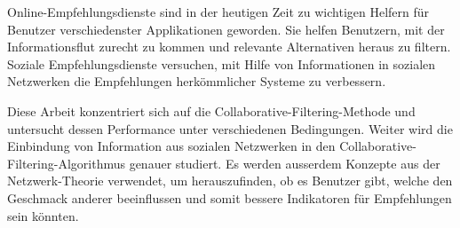 \begin{zusammenfassung}
Online-Empfehlungsdienste sind in der heutigen Zeit zu wichtigen Helfern f\"ur Benutzer verschiedenster Applikationen geworden. Sie helfen Benutzern, mit der Informationsflut zurecht zu kommen und relevante Alternativen heraus zu filtern. Soziale Empfehlungsdienste versuchen, mit Hilfe von Informationen in sozialen Netzwerken die Empfehlungen herk\"ommlicher Systeme zu verbessern.

Diese Arbeit konzentriert sich auf die Collaborative-Filtering-Methode und untersucht dessen Performance unter verschiedenen Bedingungen. Weiter wird die Einbindung von Information aus sozialen Netzwerken in den Collaborative-Filtering-Algorithmus genauer studiert. Es werden ausserdem Konzepte aus der Netzwerk-Theorie verwendet, um herauszufinden, ob es Benutzer gibt, welche den Geschmack anderer beeinflussen und somit bessere Indikatoren f\"ur Empfehlungen sein k\"onnten.
\end{zusammenfassung}

